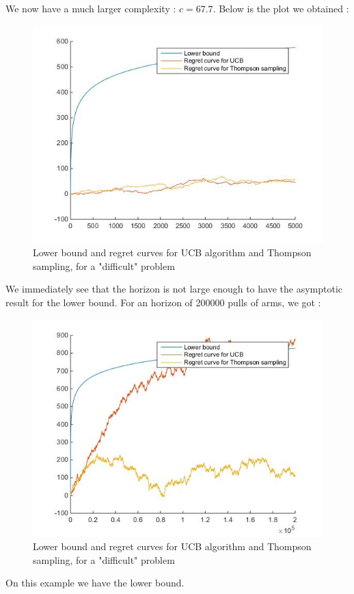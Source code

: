 \documentclass[11pt,a4paper]{article}
\begin{document}
We now have a much larger complexity : $c = 67.7$.
Below is the plot we obtained :
\begin{figure}[H]
	\centering
	\noindent\includegraphics[scale=0.4]{regret_thom_diff.jpg}
	\caption{Lower bound and regret curves for UCB algorithm and Thompson sampling, for a "difficult" problem}
\end{figure}

We immediately see that the horizon is not large enough to have the asymptotic result for the lower bound. For an horizon of 200000 pulls of arms, we got :


\begin{figure}[H]
	\centering
	\noindent\includegraphics[scale=0.4]{regret_thom_diff2.jpg}
	\caption{Lower bound and regret curves for UCB algorithm and Thompson sampling, for a "difficult" problem}
\end{figure}

On this example we have the lower bound.
\end{document}
